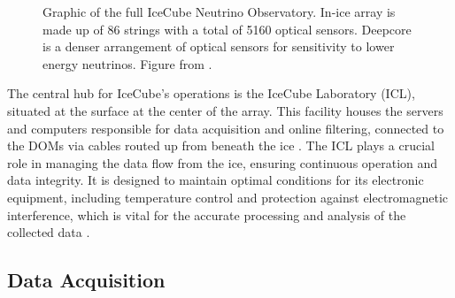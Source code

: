 \begin{figure}
    \caption{Graphic of the full IceCube Neutrino Observatory. In-ice array is made up of 86 strings with a total of 5160 optical sensors. Deepcore is a denser arrangement of optical sensors for sensitivity to lower energy neutrinos. Figure from \cite{IceCube_SPGallery}.}
\end{figure}

The central hub for IceCube's operations is the IceCube Laboratory (ICL), situated at the surface at the center of the array.
This facility houses the servers and computers responsible for data acquisition and online filtering, connected to the DOMs via cables routed up from beneath the ice \cite{IC3_thedetector}.
The ICL plays a crucial role in managing the data flow from the ice, ensuring continuous operation and data integrity.
It is designed to maintain optimal conditions for its electronic equipment, including temperature control and protection against electromagnetic interference, which is vital for the accurate processing and analysis of the collected data \cite{IC3_thedetector}.


\subsection{Data Acquisition}

